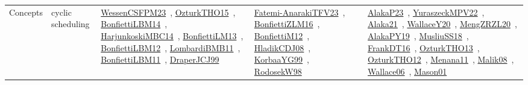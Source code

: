 {\begin{longtable}{lp{3cm}>{\raggedright\arraybackslash}p{6cm}>{\raggedright\arraybackslash}p{6cm}>{\raggedright\arraybackslash}p{8cm}}
\index{cyclic scheduling}\index{Concepts!cyclic scheduling}Concepts & cyclic scheduling & \href{../works/WessenCSFPM23.pdf}{WessenCSFPM23}~\cite{WessenCSFPM23}, \href{../works/OzturkTHO15.pdf}{OzturkTHO15}~\cite{OzturkTHO15}, \href{../works/BonfiettiLBM14.pdf}{BonfiettiLBM14}~\cite{BonfiettiLBM14}, \href{../works/HarjunkoskiMBC14.pdf}{HarjunkoskiMBC14}~\cite{HarjunkoskiMBC14}, \href{../works/BonfiettiLM13.pdf}{BonfiettiLM13}~\cite{BonfiettiLM13}, \href{../works/BonfiettiLBM12.pdf}{BonfiettiLBM12}~\cite{BonfiettiLBM12}, \href{../works/LombardiBMB11.pdf}{LombardiBMB11}~\cite{LombardiBMB11}, \href{../works/BonfiettiLBM11.pdf}{BonfiettiLBM11}~\cite{BonfiettiLBM11}, \href{../works/DraperJCJ99.pdf}{DraperJCJ99}~\cite{DraperJCJ99} & \href{../works/Fatemi-AnarakiTFV23.pdf}{Fatemi-AnarakiTFV23}~\cite{Fatemi-AnarakiTFV23}, \href{../works/BonfiettiZLM16.pdf}{BonfiettiZLM16}~\cite{BonfiettiZLM16}, \href{../works/BonfiettiM12.pdf}{BonfiettiM12}~\cite{BonfiettiM12}, \href{../works/HladikCDJ08.pdf}{HladikCDJ08}~\cite{HladikCDJ08}, \href{../works/KorbaaYG99.pdf}{KorbaaYG99}~\cite{KorbaaYG99}, \href{../works/RodosekW98.pdf}{RodosekW98}~\cite{RodosekW98} & \href{../works/AlakaP23.pdf}{AlakaP23}~\cite{AlakaP23}, \href{../works/YuraszeckMPV22.pdf}{YuraszeckMPV22}~\cite{YuraszeckMPV22}, \href{../works/Alaka21.pdf}{Alaka21}~\cite{Alaka21}, \href{../works/WallaceY20.pdf}{WallaceY20}~\cite{WallaceY20}, \href{../works/MengZRZL20.pdf}{MengZRZL20}~\cite{MengZRZL20}, \href{../works/AlakaPY19.pdf}{AlakaPY19}~\cite{AlakaPY19}, \href{../works/MusliuSS18.pdf}{MusliuSS18}~\cite{MusliuSS18}, \href{../works/FrankDT16.pdf}{FrankDT16}~\cite{FrankDT16}, \href{../works/OzturkTHO13.pdf}{OzturkTHO13}~\cite{OzturkTHO13}, \href{../works/OzturkTHO12.pdf}{OzturkTHO12}~\cite{OzturkTHO12}, \href{../works/Menana11.pdf}{Menana11}~\cite{Menana11}, \href{../works/Malik08.pdf}{Malik08}~\cite{Malik08}, \href{../works/Wallace06.pdf}{Wallace06}~\cite{Wallace06}, \href{../works/Mason01.pdf}{Mason01}~\cite{Mason01}\\

\end{longtable}}
